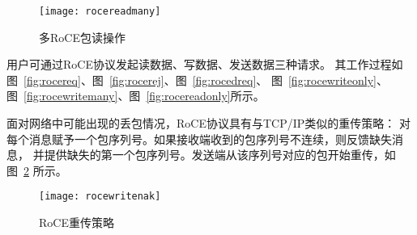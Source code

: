 \begin{figure}[htbp]
\centering
\texttt{[image: rocereadmany]}
\caption{多RoCE包读操作}\label{fig:rocereadmany}
\end{figure}

用户可通过RoCE协议发起读数据、写数据、发送数据三种请求。
其工作过程如图~\ref{fig:rocereq}、图~\ref{fig:rocerej}、图~\ref{fig:rocedreq}、
图~\ref{fig:rocewriteonly}、图~\ref{fig:rocewritemany}、图~\ref{fig:rocereadonly}所示。

面对网络中可能出现的丢包情况，RoCE协议具有与TCP/IP类似的重传策略：
对每个消息赋予一个包序列号。如果接收端收到的包序列号不连续，则反馈缺失消息，
并提供缺失的第一个包序列号。发送端从该序列号对应的包开始重传，如图~\ref{fig:rocewritenak} 所示。
\begin{figure}[htbp]
\centering
\texttt{[image: rocewritenak]}
\caption{RoCE重传策略}\label{fig:rocewritenak}
\end{figure}
